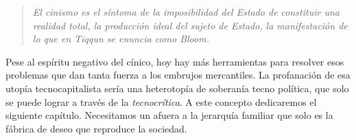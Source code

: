 \begin{quote}
  \emph{El cinismo es el síntoma de la imposibilidad del Estado de constituir una realidad total, la producción ideal del sujeto de Estado, la manifestación de lo que en Tiqqun se enuncia como Bloom.}
\end{quote}

Pese al espíritu negativo del cínico, hoy hay más herramientas para resolver esos problemas que dan tanta fuerza a los embrujos mercantiles. La profanación de esa utopía tecnocapitalista sería una heterotopía de soberanía tecno política, que solo se puede lograr a través de la \emph{tecnocrítica}. A este concepto dedicaremos el siguiente capítulo. Necesitamos un afuera a la jerarquía familiar que solo es la fábrica de deseo que reproduce la sociedad.